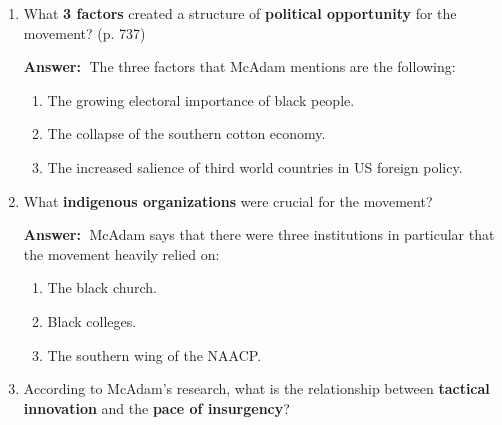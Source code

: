 \documentclass{article}
\newcommand{\answer}{\textbf{Answer:}$\;$}
\begin{document}
\begin{enumerate}[label=\arabic*)]
    \answer 
    To define tactical interaction, it is important to first define tactical innovation and tactical adaptation.
    \begin{enumerate}
        \item \textbf{Tactical innovation:}
        This is a term that refers to the creativity of insurgents to come up with new tactics of disruption.
        \item \textbf{Tactical adaptation:}
        This is a term that refers to the ability of the opposition to counter or otherwise diminish the disruption caused by the tactics of insurgents.
    \end{enumerate}
    With these terms defined, we can think of \textbf{tactical interaction} as a process of interleaved tactical innovation and tactical adaptation.
    It is the dynamic of insurgents coming up with new ideas to disrupt the social order and the responses of the opposition to mitigate the damage caused by those tactics.
    
    \item What \textbf{3 factors} created a structure of \textbf{political opportunity} for the movement? (p. 737)
    
    \answer
    The three factors that McAdam mentions are the following:
    \begin{enumerate}
        \item The growing electoral importance of black people.
        \item The collapse of the southern cotton economy.
        \item The increased salience of third world countries in US foreign policy.
    \end{enumerate}
    

    \item What \textbf{indigenous organizations} were crucial for the movement?
    
    \answer
    McAdam says that there were three institutions in particular that the movement heavily relied on:
    \begin{enumerate}
        \item The black church.
        \item Black colleges.
        \item The southern wing of the NAACP.
    \end{enumerate}
    
    \item According to McAdam's research, what is the relationship between \textbf{tactical innovation} and the \textbf{pace of insurgency}?
    

\end{enumerate}
\end{document}
